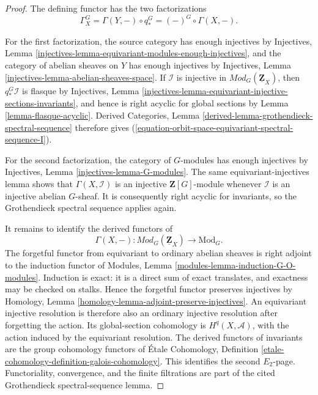 \begin{proof}
The defining functor has the two factorizations
$$
\Gamma_X^G
=
\Gamma(Y, -) \circ q_*^G
=
(-)^G \circ \Gamma(X, -).
$$

For the first factorization, the source category has enough injectives by
Injectives, Lemma
\ref{injectives-lemma-equivariant-modules-enough-injectives}, and the
category of abelian sheaves on $Y$ has enough injectives by Injectives,
Lemma \ref{injectives-lemma-abelian-sheaves-space}. If $\mathcal{I}$ is
injective in $\textit{Mod}_G(\underline{\mathbf{Z}}_X)$, then
$q_*^G\mathcal{I}$ is flasque by Injectives, Lemma
\ref{injectives-lemma-equivariant-injective-sections-invariants}, and hence
is right acyclic for global sections by Lemma
\ref{lemma-flasque-acyclic}. Derived Categories, Lemma
\ref{derived-lemma-grothendieck-spectral-sequence} therefore gives
(\ref{equation-orbit-space-equivariant-spectral-sequence-I}).

For the second factorization, the category of $G$-modules has enough
injectives by Injectives, Lemma \ref{injectives-lemma-G-modules}. The same
equivariant-injectives lemma shows that
$\Gamma(X, \mathcal{I})$ is an injective $\mathbf{Z}[G]$-module whenever
$\mathcal{I}$ is an injective abelian $G$-sheaf. It is consequently right
acyclic for invariants, so the Grothendieck spectral sequence applies again.

It remains to identify the derived functors of
$$
\Gamma(X, -) :
\textit{Mod}_G(\underline{\mathbf{Z}}_X)
\longrightarrow \text{Mod}_G.
$$
The forgetful functor from equivariant to ordinary abelian sheaves is right
adjoint to the induction functor of Modules, Lemma
\ref{modules-lemma-induction-G-O-modules}. Induction is exact: it is a direct
sum of exact translates, and exactness may be checked on stalks. Hence the
forgetful functor preserves injectives by Homology, Lemma
\ref{homology-lemma-adjoint-preserve-injectives}. An equivariant injective
resolution is therefore also an ordinary injective resolution after
forgetting the action. Its global-section cohomology is
$H^q(X, \mathcal{A})$, with the action induced by the equivariant resolution.
The derived functors of invariants are the group cohomology functors of
\'Etale Cohomology, Definition
\ref{etale-cohomology-definition-galois-cohomology}. This identifies the
second $E_2$-page. Functoriality, convergence, and the finite filtrations are
part of the cited Grothendieck spectral-sequence lemma.
\end{proof}

